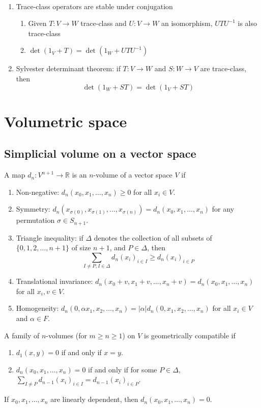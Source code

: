 \documentclass{treatise}
\begin{document}
\begin{shaded}
\begin{theorem}
\begin{enumerate}
\end{enumerate}
\end{theorem}
\begin{proposition} \ 
\begin{enumerate}
	\item Trace-class operators are stable under conjugation
	\begin{enumerate}
		\item Given $T: V \to W$ trace-class and $U: V \to W$ an isomorphism, $UTU^{-1}$ is also trace-class
		\item $\det (1_V + T) = \det (1_W + UTU^{-1})$
	\end{enumerate}
	\item Sylvester determinant theorem: if $T: V \to W$ and $S: W \to V$ are trace-class, then
	$$\det (1_W + ST) = \det(1_V + ST)$$
\end{enumerate}
\end{proposition}

\section{Volumetric space}
\subsection{Simplicial volume on a vector space}
A map $d_n: V^{n + 1} \to \mathbb{R}$ is an $n$-volume of a vector space $V$ if
\begin{enumerate}
	\item Non-negative: $d_n(x_0, x_1, \hdots, x_n) \geq 0$ for all $x_i \in V$.
	\item Symmetry: $d_n (x_{\sigma(0)}, x_{\sigma(1)}, \hdots, x_{\sigma(n)}) = d_n(x_0, x_1, \hdots, x_n)$ for any permutation $\sigma \in S_{n + 1}$.
	\item Triangle inequality: if $\Delta$ denotes the collection of all subsets of $\{ 0, 1, 2, \hdots, n + 1 \}$ of size $n + 1$, and $P \in \Delta$, then
	$$\sum_{I \neq P, I \in \Delta} d_n (x_i)_{i \in I} \geq d_n (x_i)_{i \in P}$$
	\item Translational invariance: $d_n (x_0 + v, x_1 + v, \hdots, x_n + v) = d_n(x_0, x_1, \hdots, x_n)$ for all $x_i, v \in V$.
	\item Homogeneity: $d_n (0, \alpha x_1, x_2, \hdots, x_n) = |\alpha| d_n(0, x_1, x_2, \hdots, x_n)$ for all $x_i \in V$ and $\alpha \in F$.
\end{enumerate}
A family of $n$-volumes (for $m \geq n \geq 1$) on $V$ is geometrically compatible if
\begin{enumerate}
	\item $d_1 (x, y) = 0$ if and only if $x = y$.
	\item $d_n (x_0, x_1, \hdots, x_n) = 0$ if and only if for some $P \in \Delta$, $\sum_{I \neq P} d_{n - 1} (x_i)_{i \in I} = d_{n - 1} (x_i)_{i \in P}$.
\end{enumerate}
\begin{proposition}
If $x_0, x_1, \hdots, x_n$ are linearly dependent, then $d_n (x_0, x_1, \hdots, x_n) = 0$.
\end{proposition}


\end{shaded}
\end{document}
